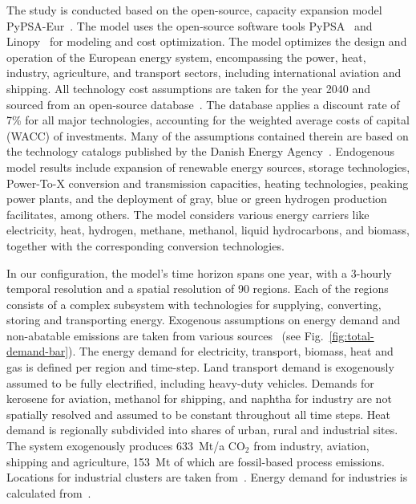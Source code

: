 \documentclass[twocolumn]{article}
\newcommand{\carbon}{CO$_2$}
\begin{document}
The study is conducted based on the open-source, capacity expansion model PyPSA-Eur~\cite{horschPyPSAEurOpenOptimisation2018,brownSynergiesSectorCoupling2018,PyPSAEurSecSectorCoupledOpen2023}.
The model uses the open-source software tools PyPSA~\cite{brownPyPSAPythonPower2018} and Linopy~\cite{hofmannLinopyLinearOptimization2023}
for modeling and cost optimization.
The model optimizes the design and operation of the European energy system, encompassing the power, heat, industry, agriculture, and transport sectors, including international aviation and shipping.
All technology cost assumptions are taken for the year 2040 and sourced from an open-source database~\cite{zeyenPyPSATechnologydataTechnology2023}. The database applies a discount rate of 7\% for all major technologies, accounting for the weighted average costs of capital (WACC) of investments.
Many of the assumptions contained therein are based on the technology catalogs published by the Danish Energy Agency~\cite{danishenergyagencyTechnologyDataGeneration2019,thedanishenergyagencyTechnologyDataCarbon2023}.
Endogenous model results include expansion of renewable energy sources, storage technologies, Power-To-X conversion and transmission capacities, heating technologies, peaking power plants, and the deployment of gray, blue or green hydrogen production facilitates, among others.
The model considers various energy carriers like electricity, heat, hydrogen, methane, methanol, liquid hydrocarbons, and biomass, together with the corresponding conversion technologies.



%
In our configuration, the model's time horizon spans one year, with a 3-hourly temporal resolution and a spatial resolution of 90 regions. Each of the regions consists of a complex subsystem with technologies for supplying, converting, storing and transporting energy. Exogenous assumptions on energy demand and non-abatable emissions are taken from various sources~\cite{piamanzGeoreferencedIndustrialSites2018,muehlenpfordtTimeSeries2019,mantzosJRCIDEES20152018,NationalEmissionsReported2023,EurostatCompleteEnergyBalance,uwekrienDemandlib2023} (see Fig.~\ref{fig:total-demand-bar}). The energy demand for electricity, transport, biomass, heat and gas is defined per region and time-step.
Land transport demand is exogenously assumed to be fully electrified, including heavy-duty vehicles.
Demands for kerosene for aviation, methanol for shipping, and naphtha for industry are not spatially resolved and assumed to be constant throughout all time steps.
Heat demand is regionally subdivided into shares of urban, rural and industrial sites.
The system exogenously produces 633~Mt/a \carbon{} from industry, aviation, shipping and agriculture, 153~Mt of which are fossil-based process emissions.
Locations for industrial clusters are taken from~\cite{hotmaps_industrial_db}. Energy demand for industries is calculated from~\cite{mantzosJRCIDEES20152018}.
\end{document}
